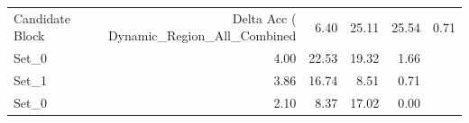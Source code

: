 \begin{tabular}{lrrrr}
\toprule
Candidate Block & Delta Acc (%
\midrule
Dynamic_Region_All_Combined & 6.40 & 25.11 & 25.54 & 0.71 \\
Set_0 & 4.00 & 22.53 & 19.32 & 1.66 \\
Set_1 & 3.86 & 16.74 & 8.51 & 0.71 \\
Set_0 & 2.10 & 8.37 & 17.02 & 0.00 \\
\bottomrule
\end{tabular}
